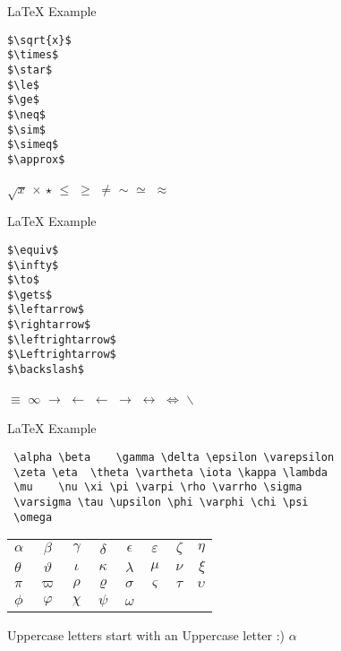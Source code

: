 \begin{frame}[t,fragile]{LaTeX Example}


  \begin{lstlisting}
$\sqrt{x}$
$\times$
$\star$
$\le$
$\ge$
$\neq$
$\sim$
$\simeq$
$\approx$
  \end{lstlisting}

$\sqrt{x}$
$\times$
$\star$
$\le$
$\ge$
$\neq$
$\sim$
$\simeq$
$\approx$
\end{frame}

\begin{frame}[t,fragile]{LaTeX Example}
  \begin{lstlisting}
$\equiv$
$\infty$
$\to$
$\gets$
$\leftarrow$
$\rightarrow$
$\leftrightarrow$
$\Leftrightarrow$
$\backslash$
  \end{lstlisting}

$\equiv$
$\infty$
$\to$
$\gets$
$\leftarrow$
$\rightarrow$
$\leftrightarrow$
$\Leftrightarrow$
$\backslash$

\end{frame}

\begin{frame}[t,fragile]{LaTeX Example}

  \begin{lstlisting}
 \alpha \beta	 \gamma \delta \epsilon \varepsilon
 \zeta \eta	 \theta \vartheta \iota \kappa \lambda
 \mu	\nu \xi \pi \varpi \rho \varrho \sigma
 \varsigma \tau \upsilon \phi \varphi \chi \psi
 \omega
  \end{lstlisting}

\begin{tabular}{ l c c c c c c r }
  $\alpha$ & $\beta$ & $\gamma$ & $\delta$ & $\epsilon$ & $\varepsilon$ & $\zeta$ & $\eta$ \\
  $\theta$ & $\vartheta$ & $\iota$ & $\kappa$ & $\lambda$ & $\mu$ & $\nu$ & $\xi$ \\
  $\pi$ & $\varpi$ & $\rho$ & $\varrho$ & $\sigma$ & $\varsigma$ & $\tau$ & $\upsilon$ \\
  $\phi$ & $\varphi$ & $\chi$ & $\psi$ & $\omega$ \\
\end{tabular}

Uppercase letters start with an Uppercase letter :) $\alpha$

\end{frame}

